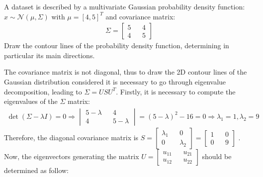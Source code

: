 \Exercise[number={1}]
A dataset is described by a multivariate Gaussian probability density
function: \(x \sim \mathcal{N}(\mu, \Sigma)\) with \(\mu=[4,5]^T\)
and covariance matrix:
\begin{align*}
    \Sigma=
    \begin{bmatrix}
        5&&4\\4&&5
    \end{bmatrix}
\end{align*}
Draw the contour lines of the probability density function, determining
in particular its main directions.

\Answer[number={1}]
The covariance matrix is not diagonal, thus to draw the 2D contour lines of
the Gaussian distribution considered it is necessary to go through eigenvalue
decomposition, leading to \(\Sigma=USU^T\).
Firstly, it is necessary to compute the eigenvalues of the \(\Sigma\) matrix:
\begin{align*}
    \det{(\Sigma - \lambda I)} = 0
    \Rightarrow
    \begin{vmatrix}
        5-\lambda && 4 \\
        4 && 5-\lambda
    \end{vmatrix}
    =
    (5-\lambda)^2 - 16 = 0
    \Rightarrow
    \lambda_1 = 1, \lambda_2 = 9
\end{align*}
Therefore, the diagonal covariance matrix is
\(
    S
    =
    \begin{bmatrix}
        \lambda_1 && 0 \\
        0 && \lambda_2
    \end{bmatrix}
    =
    \begin{bmatrix}
        1 && 0 \\
        0 && 9
    \end{bmatrix}
\)
. \\
Now, the eigenvectors generating the matrix
\(
    U
    =
    \begin{bmatrix}
        u_{11} && u_{21} \\
        u_{12} && u_{22}
    \end{bmatrix}
\)
should be determined as follow:

